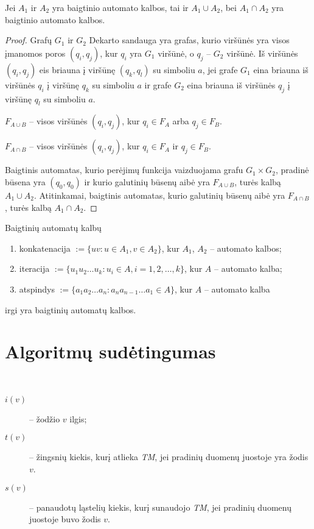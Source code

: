\begin{prop}
  Jei $A_1$ ir $A_2$ yra baigtinio automato kalbos, tai ir 
  $A_1 \cup A_2$, bei $A_1 \cap A_2$ yra baigtinio automato kalbos.

  \begin{proof}
    Grafų $G_1$ ir $G_2$ Dekarto sandauga yra grafas, kurio viršūnės yra 
    visos įmanomos poros $(q_i,q_j)$, kur $q_i$ yra $G_1$ viršūnė, o 
    $q_j$ – $G_2$ viršūnė. Iš viršūnės $(q_i,q_j)$ eis briauna į 
    viršūnę $(q_k,q_l)$ su simboliu $a$, jei grafe $G_1$ eina briauna iš
    viršūnės $q_i$ į viršūnę $q_k$ su simboliu $a$ ir grafe $G_2$ eina
    briauna iš viršūnės $q_j$ į viršūnę $q_l$ su simboliu $a$.
    
    $F_{A \cup B}$ – visos viršūnės $(q_i,q_j)$, kur $q_i \in F_{A}$
    arba $q_j \in F_{B}$.

    $F_{A \cap B}$ – visos viršūnės $(q_i,q_j)$, kur $q_i \in F_{A}$
    ir $q_j \in F_{B}$.

    Baigtinis automatas, kurio perėjimų funkcija vaizduojama grafu
    $G_1 \times G_2$, pradinė būsena yra $(q_0, q_0)$ ir kurio
    galutinių būsenų aibė yra $F_{A \cup B}$, turės kalbą
    $A_1 \cup A_2$. Atitinkamai, baigtinis automatas, kurio galutinių
    būsenų aibė yra $F_{A \cap B}$, turės kalbą $A_1 \cap A_2$.
  \end{proof}
\end{prop}

\begin{prop}
  Baigtinių automatų kalbų
  \begin{enumerate}
    \item konkatenacija $:= \{ uv : u \in A_1, v \in A_2 \}$, kur 
      $A_1$, $A_2$ – automato kalbos;
    \item iteracija $:=\{u_1 u_2 \dots u_k : u_i \in A, i=1,2,\dotsc,k\}$,
      kur $A$ – automato kalba;
    \item atspindys $:=\{a_1 a_2 \dots a_n : a_n a_{n-1} \dots a_1 %
      \in A \}$, kur $A$ – automato kalba
  \end{enumerate}
    irgi yra baigtinių automatų kalbos.
\end{prop}

\section{Algoritmų sudėtingumas}

\begin{notation}
  \hfill \\
  \begin{description}
    \item[$i(v)$] – žodžio $v$ ilgis;
    \item[$t(v)$] – žingsnių kiekis, kurį atlieka \emph{TM}, jei 
      pradinių duomenų juostoje yra žodis $v$.
    \item[$s(v)$] – panaudotų ląstelių kiekis, kurį sunaudojo \emph{TM},
      jei pradinių duomenų juostoje buvo žodis $v$.
  \end{description}
\end{notation}

